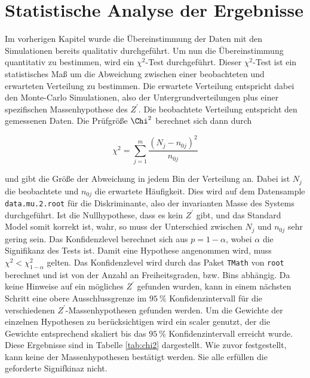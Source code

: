 \section{Statistische Analyse der Ergebnisse}
\label{sec:chi}

Im vorherigen Kapitel wurde die Übereinstimmung der Daten mit den Simulationen bereits qualitativ durchgeführt.
Um nun die Übereinstimmung quantitativ zu bestimmen, wird ein $\chi^2$-Test durchgeführt.
Dieser $\chi^2$-Test ist ein statistisches Maß um die Abweichung zwischen einer beobachteten und erwarteten Verteilung zu bestimmen.
Die erwartete Verteilung entspricht dabei den Monte-Carlo Simulationen, also der Untergrundverteilungen plus einer spezifischen Massenhypothese des $Z^\prime$.
Die beobachtete Verteilung entspricht den gemessenen Daten.
Die Prüfgröße $\Chi^2$ berechnet sich dann durch

\begin{equation}
  \chi^2 = \sum_{j=1}^m \frac{(N_j - n_{0j})^2}{n_{0j}}
\end{equation}

und gibt die Größe der Abweichung in jedem Bin der Verteilung an.
Dabei ist $N_j$ die beobachtete und $n_{0j}$ die erwartete Häufigkeit.
Dies wird auf dem Datensample \texttt{data.mu.2.root} für die Diskriminante, also der invarianten Masse des Systems durchgeführt.
Ist die Nullhypothese, dass es kein $Z^\prime$ gibt, und das Standard Model somit 
korrekt ist, wahr, so muss der Unterschied zwischen $N_j$ und $n_{0j}$ sehr gering sein.
Das Konfidenzlevel berechnet sich aus $p = 1 - \alpha$, wobei $\alpha$ die Signifikanz des Tests ist.
Damit eine Hypothese angenommen wird, muss $\chi^2 < \chi^2_{1-\alpha}$ gelten.
Das Konfidenzlevel wird durch das Paket \texttt{TMath} von \texttt{root} berechnet und ist von der Anzahl an Freiheitsgraden, bzw. Bins abhängig.
Da keine Hinweise auf ein mögliches $Z^\prime$ gefunden wurden, kann in einem nächsten Schritt eine obere Ausschlussgrenze im $\SI{95}{\percent}$ Konfidenzintervall für die verschiedenen $Z^\prime$-Massenhypothesen gefunden werden.
Um die Gewichte der einzelnen Hypothesen zu berücksichtigen wird ein scaler genutzt, der die Gewichte entsprechend skaliert bis das $\SI{95}{\percent}$ Konfidenzintervall erreicht wurde.
Diese Ergebnisse sind in Tabelle \ref{tab:chi2} dargestellt.
Wie zuvor festgestellt, kann keine der Massenhypothesen bestätigt werden.
Sie alle erfüllen die geforderte Signifkinaz nicht.

